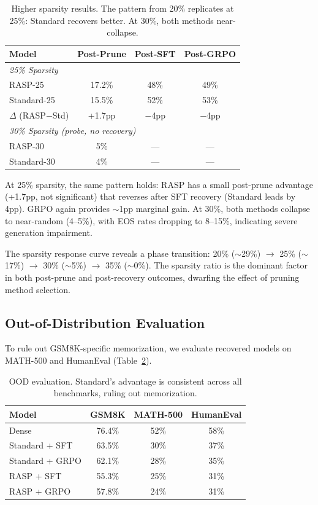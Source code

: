 \documentclass[11pt,a4paper]{article}
\begin{document}
\begin{table}[t]
\centering
\small
\begin{tabular}{lccc}
\toprule
\textbf{Model} & \textbf{Post-Prune} & \textbf{Post-SFT} & \textbf{Post-GRPO} \\
\midrule
\multicolumn{4}{l}{\emph{25\% Sparsity}} \\
RASP-25 & 17.2\% & 48\% & 49\% \\
Standard-25 & 15.5\% & 52\% & 53\% \\
$\Delta$ (RASP$-$Std) & +1.7pp & $-$4pp & $-$4pp \\
\midrule
\multicolumn{4}{l}{\emph{30\% Sparsity (probe, no recovery)}} \\
RASP-30 & 5\% & --- & --- \\
Standard-30 & 4\% & --- & --- \\
\bottomrule
\end{tabular}
\caption{Higher sparsity results. The pattern from 20\% replicates at 25\%: Standard recovers better. At 30\%, both methods near-collapse.}
\label{tab:sparsity}
\end{table}

At 25\% sparsity, the same pattern holds: RASP has a small post-prune advantage (+1.7pp, not significant) that reverses after SFT recovery (Standard leads by 4pp). GRPO again provides $\sim$1pp marginal gain. At 30\%, both methods collapse to near-random (4--5\%), with EOS rates dropping to 8--15\%, indicating severe generation impairment.

The sparsity response curve reveals a phase transition: 20\% ($\sim$29\%) $\to$ 25\% ($\sim$17\%) $\to$ 30\% ($\sim$5\%) $\to$ 35\% ($\sim$0\%). The sparsity ratio is the dominant factor in both post-prune and post-recovery outcomes, dwarfing the effect of pruning method selection.


\subsection{Out-of-Distribution Evaluation}
\label{sec:ood}

To rule out GSM8K-specific memorization, we evaluate recovered models on MATH-500 and HumanEval (Table~\ref{tab:ood}).

\begin{table}[t]
\centering
\small
\begin{tabular}{lccc}
\toprule
\textbf{Model} & \textbf{GSM8K} & \textbf{MATH-500} & \textbf{HumanEval} \\
\midrule
Dense & 76.4\% & 52\% & 58\% \\
Standard + SFT & 63.5\% & 30\% & 37\% \\
Standard + GRPO & 62.1\% & 28\% & 35\% \\
RASP + SFT & 55.3\% & 25\% & 31\% \\
RASP + GRPO & 57.8\% & 24\% & 31\% \\
\bottomrule
\end{tabular}
\caption{OOD evaluation. Standard's advantage is consistent across all benchmarks, ruling out memorization.}
\label{tab:ood}
\end{table}
\end{document}
